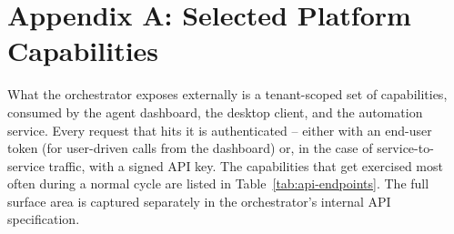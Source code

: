 \chapter*{Appendix A: Selected Platform Capabilities}

What the orchestrator exposes externally is a tenant-scoped set of capabilities, consumed by the agent dashboard, the desktop client, and the automation service. Every request that hits it is authenticated -- either with an end-user token (for user-driven calls from the dashboard) or, in the case of service-to-service traffic, with a signed API key. The capabilities that get exercised most often during a normal cycle are listed in Table~\ref{tab:api-endpoints}. The full surface area is captured separately in the orchestrator's internal API specification.

